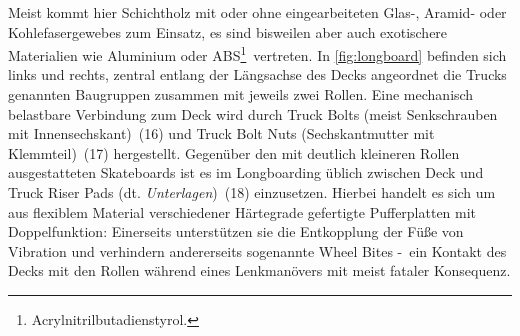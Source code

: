 		Meist kommt hier Schichtholz mit oder ohne eingearbeiteten Glas-, Aramid- oder Kohlefasergewebes zum Einsatz, es sind bisweilen aber auch exotischere Materialien wie Aluminium oder ABS\footnote{\hspace{1mm} Acrylnitrilbutadienstyrol.}~vertreten.
		In \cref{fig:longboard} befinden sich links und rechts, zentral entlang der Längsachse des Decks angeordnet die Trucks genannten Baugruppen zusammen mit jeweils zwei Rollen.
		Eine mechanisch belastbare Verbindung zum Deck wird durch Truck Bolts (meist Senkschrauben mit Innensechskant)~(16) und Truck Bolt Nuts (Sechskantmutter mit Klemmteil)~(17) hergestellt.
		Gegenüber den mit deutlich kleineren Rollen ausgestatteten Skateboards ist es im Longboarding üblich zwischen Deck und Truck Riser Pads (dt. \textit{Unterlagen})~(18) einzusetzen.
		Hierbei handelt es sich um aus flexiblem Material verschiedener Härtegrade gefertigte Pufferplatten mit Doppelfunktion:
		Einerseits unterstützen sie die Entkopplung der Füße von Vibration und verhindern andererseits sogenannte Wheel Bites -~ein Kontakt des Decks mit den Rollen während eines Lenkmanövers mit meist fataler Konsequenz.

